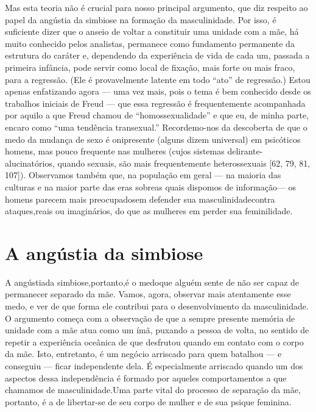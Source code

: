 Mas esta teoria não é crucial para nosso principal argumento, que
diz respeito ao papel da angústia\idxangusimb{} da simbiose\idxangus{} na formação da
masculinidade. Por isso, é suficiente dizer que o anseio de voltar a
constituir uma unidade com a mãe, há muito conhecido pelos analistas,
permanece como fundamento permanente da estrutura do caráter e,
dependendo da experiência de vida de cada um, passada a primeira
infância, pode servir como local de fixação, mais forte ou mais fraco,
para a regressão.\idxhomosregr{} (Ele é provavelmente latente em todo
``ato'' de regressão.) Estou apenas
enfatizando agora --- uma vez mais, pois o tema é bem conhecido desde
os trabalhos iniciais de Freud\idxfreudhomos{} --- que essa regressão é
frequentemente acompanhada por aquilo a que Freud chamou de
``homossexualidade'' e que eu, de minha
parte, encaro como ``uma tendência
transexual.'' Recordemo-nos da descoberta de que o medo
da mudança de sexo é onipresente (alguns dizem universal) em psicóticos\idxpsico{}
homens, mas pouco frequente nas mulheres (cujos sistemas
delirante-alucinatórios, quando sexuais, são mais frequentemente
heterossexuais [62, 79, 81, 107]). Observamos também que, na população
em geral --- na maioria das culturas e na maior parte das eras sobre\idxtranseetio[|)]
as quais dispomos de informação\idxmaesfilh[|)] --- os homens parecem mais preocupados\idxtransesimb[|)]
em defender sua masculinidade\idxmaestran[|)] contra ataques,\idxidengen[|)] reais ou imaginários, do
que as mulheres em perder sua feminilidade.

\section{A angústia da simbiose}

A angústia\idxangus[|(] da simbiose,\idxmaesproc[|(] portanto,\idxangusimb[|(] é o medo\idxhomosneur[|(] que alguém sente de não
ser capaz de permanecer separado da mãe. Vamos, agora, observar mais
atentamente esse medo, e ver de que forma ele contribui para o
desenvolvimento da masculinidade.\idxmascumud{} O argumento começa com a observação
de que a sempre presente memória de unidade com a mãe\idxmaesiden{} atua como um ímã,
puxando a pessoa de volta, no sentido de repetir a experiência oceânica
de que desfrutou quando em contato com o corpo da mãe. Isto,
entretanto, é um negócio arriscado para quem batalhou --- e conseguiu
--- ficar independente dela. É especialmente arriscado quando um dos
aspectos dessa independência é formado por aqueles comportamentos a que
 chamamos de\idxmascag{} masculinidade.\idxagresmasc[|(] Uma parte vital do processo de separação da
mãe, portanto, é a de libertar-se de seu corpo de mulher e de sua
psique feminina.

